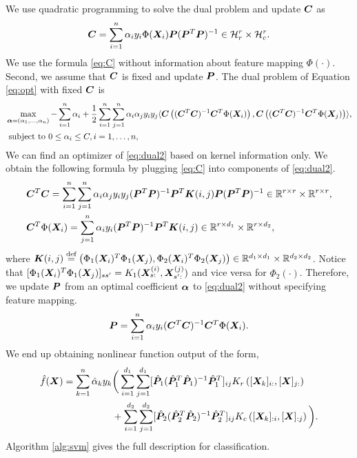 \documentclass[12pt]{article}
\begin{document}
We use quadratic programming to solve the dual problem and update $\bm C$ as
\begin{align}\label{eq:C}
    \bm C = \sum_{i=1}^n \alpha_iy_i \Phi(\bm X_i) \bm{P}(\bm{P}^T\bm{P})^{-1}\in\mathcal{H}_r^r\times \mathcal{H}_c^r.
\end{align}
We use the formula \eqref{eq:C} without information about feature mapping $\Phi(\cdot)$.
Second, we assume that $\bm C$ is fixed and update $\bm{P}$. The dual problem of Equation \eqref{eq:opt} with fixed $\bm C$ is 
\begin{align}
    \label{eq:dual2}
    &\max_{\bm\alpha = (\alpha_1,\ldots,\alpha_n)}-\sum_{i=1}^n\alpha_i + \frac{1}{2}\sum_{i=1}^n\sum_{j=1}^n \alpha_i\alpha_j y_iy_j\langle 
    \bm C\left((\bm C^T\bm C)^{-1}\bm C^T\Phi(\bm X_i)\right),\bm C\left((\bm C^T\bm C)^{-1}\bm C^T\Phi(\bm X_j)\right)\rangle,\\
    &\text{ subject to }  0\leq \alpha_i\leq C, i=1,\ldots,n,
\end{align}
We can find an optimizer of \eqref{eq:dual2} based on kernel information only. We obtain the following formula by plugging \eqref{eq:C} into components of \eqref{eq:dual2}. 
\begin{align}\label{eq:helpeq}
 &\bm C^T\bm C = \sum_{i=1}^n\sum_{j=1}^n \alpha_i\alpha_jy_iy_j(\bm{P}^T\bm{P})^{-1}\bm{P}^T\bm K(i,j) \bm{P}(\bm{P}^T\bm{P})^{-1}\in\mathbb{R}^{r\times r}\times \mathbb{R}^{r\times r},\\
 &\bm C^T\Phi(\bm X_i) = \sum_{j=1}^n \alpha_iy_i(\bm{P}^T\bm{P})^{-1}\bm{P}^T\bm K(i,j)\in\mathbb{R}^{r\times d_1}\times \mathbb{R}^{r\times d_2},
\end{align}
where $\bm K(i,j) \stackrel{\text{def}}{=} \left( \Phi_1(\bm X_i)^T\Phi_1(\bm X_j),\Phi_2(\bm X_i)^T\Phi_2(\bm X_j)\right)\in \mathbb{R}^{d_1\times d_1}\times \mathbb{R}^{d_2\times d_2}$. Notice that $[\Phi_1(\bm X_i)^T
\Phi_1(\bm X_j)]_{ss'} = K_1(\bm X^{(i)}_{s:},\bm X^{(j)}_{s':})$ and vice versa for $\Phi_2(\cdot)$.
Therefore, we update $\bm{P}$  from an optimal coefficient $\bm\alpha$ to \eqref{eq:dual2} without specifying feature mapping.
\begin{align}
    \bm{P} = \sum_{i=1}^n\alpha_iy_i(\bm C^T\bm C)^{-1}\bm C^T\Phi(\bm X_i).
\end{align}
We end up obtaining nonlinear function output of the form,
\begin{align}\label{eq:output}
    \hat f(\bm X) = \sum_{k=1}^n\hat\alpha_ky_k&\bigg(\sum_{i=1}^{d_1}\sum_{j=1}^{d_1}[\hat{\bm{P}}_1(\hat{\bm{P}}_1^T\hat{\bm{P}}_1)^{-1}\hat{\bm{P}}_1^T]_{ij}K_r\left([\bm X_k]_{i:},[\bm X]_{j:}\right)\\ &+\sum_{i=1}^{d_2}\sum_{j=1}^{d_2}[\hat{\bm{P}}_2(\hat{\bm{P}}_2^T\hat{\bm{P}}_2)^{-1}\hat{\bm{P}}_2^T]_{ij}K_c\left([\bm X_k]_{:i},[\bm X]_{:j}\right)\bigg).
\end{align}
Algorithm \ref{alg:svm} gives the full description for classification. 
\end{document}
